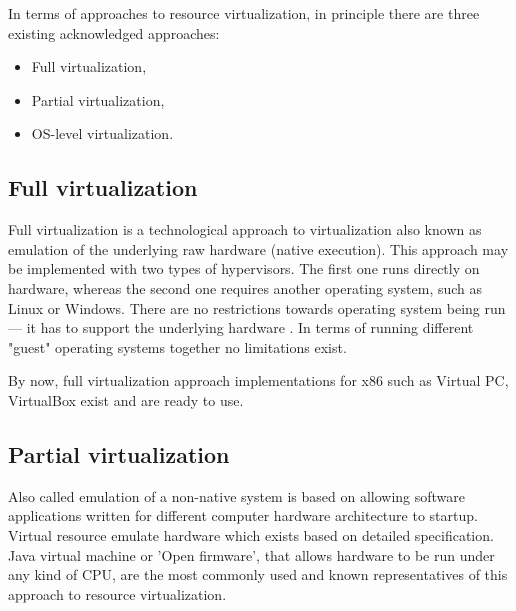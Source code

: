 \documentclass[11pt,openany]{book}
\begin{document}

        In terms of approaches to resource virtualization, in principle there are three existing acknowledged
        approaches:

        \begin{itemize}
          \item{Full virtualization,}
          \item{Partial virtualization,}
          \item{OS-level virtualization.}
        \end{itemize}


      \subsection{Full virtualization}

        Full virtualization is a technological approach to virtualization also known as emulation of the underlying raw
        hardware (native execution). This approach may be implemented with two types of hypervisors. The first one runs
        directly on hardware, whereas the second one requires another operating system, such as Linux or Windows. There
        are no restrictions towards operating system being run --- it has to support the underlying hardware .
        In terms of running different "guest"  operating systems together no limitations exist.

        By now, full virtualization approach implementations for x86 such as Virtual PC, VirtualBox exist and are ready
        to use. 


      \subsection{Partial virtualization}

        Also called emulation of a non-native system is based on allowing software applications written for different
        computer hardware architecture to startup. Virtual resource emulate hardware which exists based on detailed
        specification. Java virtual machine or 'Open firmware', that allows hardware to be run under any kind of CPU,
        are the most commonly used and known representatives of this approach to resource virtualization. 
\end{document}
